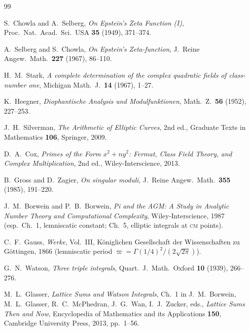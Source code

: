 \documentclass[11pt,reqno]{amsart}
\theoremstyle{plain}
\theoremstyle{definition}
\theoremstyle{remark}
\numberwithin{equation}{section}
\begin{document}
\begin{thebibliography}{99}


S.~Chowla and A.~Selberg, \emph{On Epstein's Zeta Function (I)},
Proc.~Nat.~Acad.~Sci.~USA \textbf{35} (1949), 371--374.

A.~Selberg and S.~Chowla, \emph{On Epstein's Zeta-function},
J.~Reine Angew.~Math.~\textbf{227} (1967), 86--110.

H.~M.\ Stark, \emph{A complete determination of the complex quadratic
fields of class-number one}, Michigan Math.~J.~\textbf{14} (1967),
1--27.

K.~Heegner, \emph{Diophantische Analysis und Modulfunktionen},
Math.~Z.~\textbf{56} (1952), 227--253.

J.~H.\ Silverman, \emph{The Arithmetic of Elliptic Curves}, 2nd ed.,
Graduate Texts in Mathematics \textbf{106}, Springer, 2009.

D.~A.\ Cox, \emph{Primes of the Form $x^{2} + ny^{2}$: Fermat, Class
Field Theory, and Complex Multiplication}, 2nd ed.,
Wiley-Interscience, 2013.

B.~Gross and D.~Zagier, \emph{On singular moduli},
J.~Reine Angew.~Math.~\textbf{355} (1985), 191--220.

J.~M.\ Borwein and P.~B.\ Borwein, \emph{Pi and the AGM:
A Study in Analytic Number Theory and Computational Complexity},
Wiley-Interscience, 1987 (esp.\ Ch.~1, lemniscatic constant; Ch.~5,
elliptic integrals at \textsc{cm} points).

C.~F.\ Gauss, \emph{Werke}, Vol.~III, K\"oniglichen Gesellschaft der
Wissenschaften zu G\"ottingen, 1866 (lemniscatic period
$\varpi = \Gamma(1/4)^{2}/(2\sqrt{2\pi})$).


G.~N.\ Watson, \emph{Three triple integrals},
Quart.~J.~Math.~Oxford \textbf{10} (1939), 266--276.

M.~L.\ Glasser, \emph{Lattice Sums and Watson Integrals}, Ch.~1
in J.~M.\ Borwein, M.~L.\ Glasser, R.~C.\ McPhedran, J.~G.\ Wan,
I.~J.\ Zucker, eds., \emph{Lattice Sums Then and Now}, Encyclopedia
of Mathematics and its Applications \textbf{150}, Cambridge University
Press, 2013, pp.~1--56.


\end{thebibliography}
\end{document}
